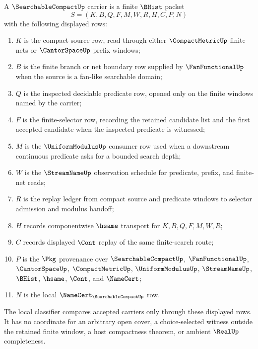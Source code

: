 \begin{definition}
\label{def:searchable-compact-carrier}
A $\SearchableCompactUp$ carrier is a finite $\BHist$ packet
$$
S=(K,B,Q,F,M,W,R,H,C,P,N)
$$
with the following displayed rows:
\begin{enumerate}
\item $K$ is the compact source row, read through either $\CompactMetricUp$ finite nets or $\CantorSpaceUp$ prefix windows;
\item $B$ is the finite branch or net boundary row supplied by $\FanFunctionalUp$ when the source is a fan-like searchable domain;
\item $Q$ is the inspected decidable predicate row, opened only on the finite windows named by the carrier;
\item $F$ is the finite-selector row, recording the retained candidate list and the first accepted candidate when the inspected predicate is witnessed;
\item $M$ is the $\UniformModulusUp$ consumer row used when a downstream continuous predicate asks for a bounded search depth;
\item $W$ is the $\StreamNameUp$ observation schedule for predicate, prefix, and finite-net reads;
\item $R$ is the replay ledger from compact source and predicate windows to selector admission and modulus handoff;
\item $H$ records componentwise $\hsame$ transport for $K,B,Q,F,M,W,R$;
\item $C$ records displayed $\Cont$ replay of the same finite-search route;
\item $P$ is the $\Pkg$ provenance over $\SearchableCompactUp$, $\FanFunctionalUp$, $\CantorSpaceUp$, $\CompactMetricUp$, $\UniformModulusUp$, $\StreamNameUp$, $\BHist$, $\hsame$, $\Cont$, and $\NameCert$;
\item $N$ is the local $\NameCert_{\SearchableCompactUp}$ row.
\end{enumerate}
The local classifier compares accepted carriers only through these displayed rows. It has no coordinate for an arbitrary open cover, a choice-selected witness outside the retained finite window, a host compactness theorem, or ambient $\RealUp$ completeness.
\end{definition}

